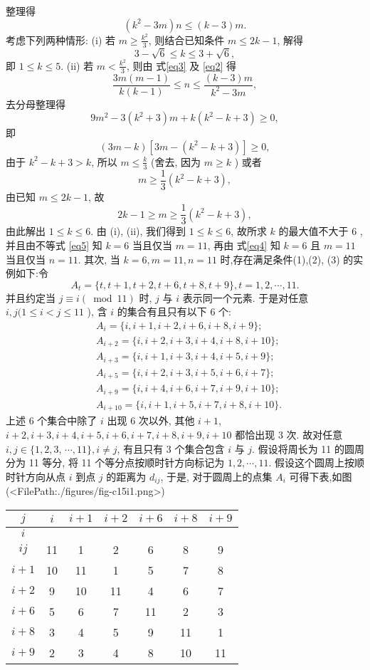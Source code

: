 整理得
$$
\left(k^2-3 m\right) n \leqslant(k-3) m . \label{eq3}
$$
考虑下列两种情形:
(i) 若 $m \geqslant \frac{k^2}{3}$, 则结合已知条件 $m \leqslant 2 k-1$, 解得
$$
3-\sqrt{6} \leqslant k \leqslant 3+\sqrt{6},
$$
即 $1 \leqslant k \leqslant 5$.
(ii) 若 $m<\frac{k^2}{3}$, 则由 式\ref{eq3} 及 \ref{eq2} 得
$$
\frac{3 m(m-1)}{k(k-1)} \leqslant n \leqslant \frac{(k-3) m}{k^2-3 m}, \label{eq4}
$$
去分母整理得
$$
9 m^2-3\left(k^2+3\right) m+k\left(k^2-k+3\right) \geqslant 0,
$$
即
$$
(3 m-k)\left[3 m-\left(k^2-k+3\right)\right] \geqslant 0,
$$
由于 $k^2-k+3>k$, 所以 $m \leqslant \frac{k}{3}$ (舍去, 因为 $m \geqslant k$ ) 或者
$$
m \geqslant \frac{1}{3}\left(k^2-k+3\right),
$$
由已知 $m \leqslant 2 k-1$, 故
$$
2 k-1 \geqslant m \geqslant \frac{1}{3}\left(k^2-k+3\right), \label{eq5}
$$
由此解出 $1 \leqslant k \leqslant 6$.
由 (i), (ii), 我们得到 $1 \leqslant k \leqslant 6$, 故所求 $k$ 的最大值不大于 6 , 并且由不等式 \ref{eq5} 知 $k=6$ 当且仅当 $m=11$, 再由 式\ref{eq4} 知 $k=6$ 且 $m=11$ 当且仅当 $n=11$.
其次, 当 $k=6, m=11, n=11$ 时,存在满足条件(1),(2), (3) 的实例如下:令
$$
A_t=\{t, t+1, t+2, t+6, t+8, t+9\}, t=1,2, \cdots, 11 .
$$
并且约定当 $j \equiv i(\bmod 11)$ 时, $j$ 与 $i$ 表示同一个元素.
于是对任意 $i, j(1 \leqslant i< j \leqslant 11$ ), 含 $i$ 的集合有且只有以下 6 个:
$$
\begin{aligned}
& A_i=\{i, i+1, i+2, i+6, i+8, i+9\} ; \\
& A_{i+2}=\{i, i+2, i+3, i+4, i+8, i+10\} ; \\
& A_{i+3}=\{i, i+1, i+3, i+4, i+5, i+9\} ; \\
& A_{i+5}=\{i, i+2, i+3, i+5, i+6, i+7\} ; \\
& A_{i+9}=\{i, i+4, i+6, i+7, i+9, i+10\} ; \\
& A_{i+10}=\{i, i+1, i+5, i+7, i+8, i+10\} .
\end{aligned}
$$
上述 6 个集合中除了 $i$ 出现 6 次以外, 其他 $i+1$, $i+2, i+3, i+4, i+5, i+6, i+7, i+8, i+ 9, i+10$ 都恰出现 3 次.
故对任意 $i, j \in\{1,2,3$, $\cdots, 11\}, i \neq j$, 有且只有 3 个集合包含 $i$ 与 $j$.
假设将周长为 11 的圆周分为 11 等分, 将 11 个等分点按顺时针方向标记为 $1,2, \cdots, 11$. 假设这个圆周上按顺时针方向从点 $i$ 到点 $j$ 的距离为 $d_{i j}$, 于是, 对于圆周上的点集 $A_i$ 可得下表,如图(<FilePath:./figures/fig-c15i1.png>) 
\begin{tabular}{|c|c|c|c|c|c|c|}
\hline$j$ & $i$ & $i+1$ & $i+2$ & $i+6$ & $i+8$ & $i+9$ \\
\hline$i$ & & & & & \\
\hline$i j$ & 11 & 1 & 2 & 6 & 8 & 9 \\
\hline$i+1$ & 10 & 11 & 1 & 5 & 7 & 8 \\
\hline$i+2$ & 9 & 10 & 11 & 4 & 6 & 7 \\
\hline$i+6$ & 5 & 6 & 7 & 11 & 2 & 3 \\
\hline$i+8$ & 3 & 4 & 5 & 9 & 11 & 1 \\
\hline$i+9$ & 2 & 3 & 4 & 8 & 10 & 11 \\
\hline
\end{tabular}
